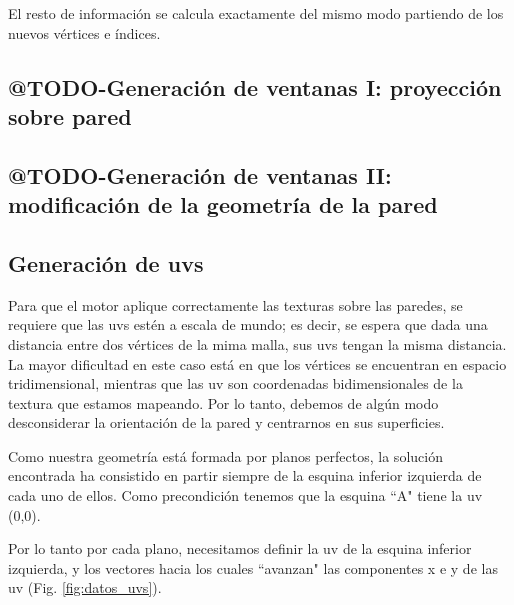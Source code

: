 El resto de información se calcula exactamente del mismo modo partiendo de los nuevos vértices e índices.

\clearpage
\subsection{@TODO-Generación de ventanas I: proyección sobre pared}

\subsection{@TODO-Generación de ventanas II: modificación de la geometría de la pared}

\subsection{Generación de uvs}
Para que el motor aplique correctamente las texturas sobre las paredes, se requiere que las uvs estén a escala de mundo; es decir, se espera que dada una distancia entre dos vértices de la mima malla, sus uvs tengan la misma distancia. La mayor dificultad en este caso está en que los vértices se encuentran en espacio tridimensional, mientras que las uv son coordenadas bidimensionales de la textura que estamos mapeando. Por lo tanto, debemos de algún modo desconsiderar la orientación de la pared y centrarnos en sus superficies.

Como nuestra geometría está formada por planos perfectos, la solución encontrada ha consistido en partir siempre de la esquina inferior izquierda de cada uno de ellos. Como precondición tenemos que la esquina ``A" tiene la uv (0,0).

Por lo tanto por cada plano, necesitamos definir la uv de la esquina inferior izquierda, y los vectores hacia los cuales ``avanzan" las componentes x e y de las uv (Fig. \ref{fig:datos_uvs}).

